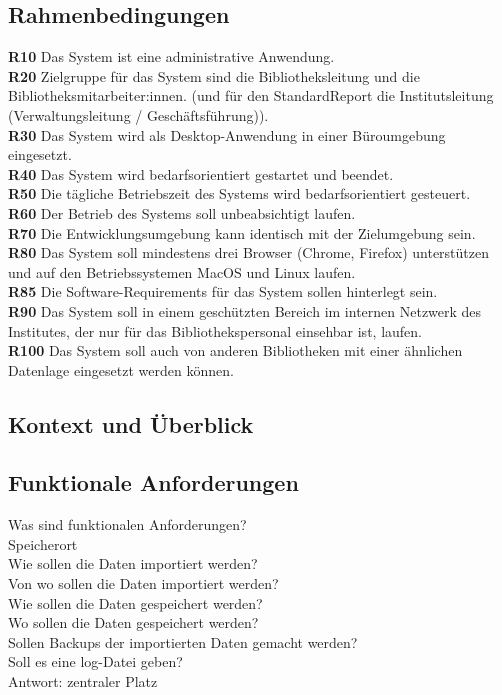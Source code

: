 \subsection{Rahmenbedingungen}
\textbf{R10} Das System ist eine administrative Anwendung.\\ 
\textbf{R20} Zielgruppe für das System sind die Bibliotheksleitung und die Bibliotheksmitarbeiter:innen. (und für den StandardReport die Institutsleitung
(Verwaltungsleitung / Geschäftsführung)).\\
\textbf{R30} Das System wird als Desktop-Anwendung in einer Büroumgebung eingesetzt.\\
\textbf{R40} Das System wird bedarfsorientiert gestartet und beendet.\\
\textbf{R50} Die tägliche Betriebszeit des Systems wird bedarfsorientiert gesteuert.\\
\textbf{R60} Der Betrieb des Systems soll unbeabsichtigt laufen.\\
\textbf{R70} Die Entwicklungsumgebung kann identisch mit der Zielumgebung sein.\\
\textbf{R80} Das System soll mindestens drei Browser (Chrome, Firefox) unterstützen und auf den Betriebssystemen MacOS und Linux laufen.\\
\textbf{R85} Die Software-Requirements für das System sollen hinterlegt sein.\\
\textbf{R90} Das System soll in einem geschützten Bereich im internen Netzwerk des Institutes, der nur für das Bibliothekspersonal einsehbar ist, laufen.\\
\textbf{R100} Das System soll auch von anderen Bibliotheken mit einer ähnlichen Datenlage eingesetzt werden können.



\subsection{Kontext und Überblick}


\subsection{Funktionale Anforderungen}
Was sind funktionalen Anforderungen?\\
Speicherort\\
Wie sollen die Daten importiert werden?\\
Von wo sollen die Daten importiert werden?\\
Wie sollen die Daten gespeichert werden?\\
Wo sollen die Daten gespeichert werden?\\
Sollen Backups der importierten Daten gemacht werden?\\
Soll es eine log-Datei geben?\\
Antwort: zentraler Platz\\

